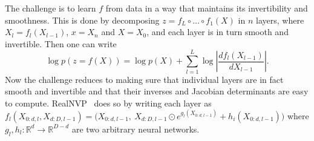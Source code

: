 The challenge is to learn $f$ from data in a way that maintains its invertibility and smoothness.
This is done by decomposing $z = f_L \circ \dots \circ f_1 (X)$ in $n$ layers, where $X_l = f_l(X_{l-1})$, $x = X_n$ and $X=X_0$, and each layer is in turn smooth and invertible.
Then one can write
$$
 \log p(z = f(X)) =
 \log p(X) + \sum_{l=1}^L \log \left| \frac{df_l(X_{l-1})}{dX_{l-1}} \right|.
$$
Now the challenge reduces to making sure that individual layers are in fact smooth and invertible and that their inverses and Jacobian determinants are easy to compute.
RealNVP~\cite{dinh17density} does so by writing each layer as $f_l(X_{0:d,l}, X_{d:D,l-1}) = \big(X_{0:d,l-1},~ X_{d:D,l-1} \odot e^{g_l(X_{0:d,l-1})} + h_i(X_{0:d,l-1})\big)$ where $g_l,h_l:\mathbb{R}^d \rightarrow \mathbb{R}^{D-d}$ are two arbitrary neural networks.


% 



% 
% 
% 

